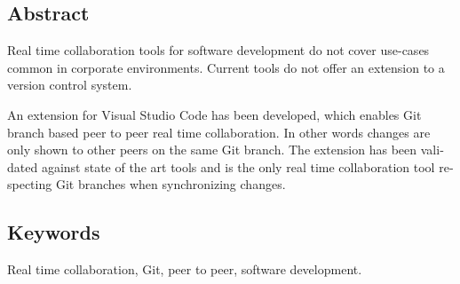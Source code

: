 \begin{otherlanguage}{english}

  \chapter*{Abstract}

  Real time collaboration tools for software development do not cover use-cases common in corporate environments. Current tools do not offer an extension to a version control system.

  An extension for Visual Studio Code has been developed, which enables Git branch based peer to peer real time collaboration. In other words changes are only shown to other peers on the same Git branch. The extension has been validated against state of the art tools and is the only real time collaboration tool respecting Git branches when synchronizing changes.

  \bigskip

  \section*{Keywords}
  Real time collaboration, Git, peer to peer, software development.

\end{otherlanguage}
